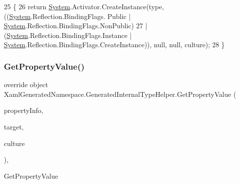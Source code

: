 \begin{DoxyCode}
25                                                                                                            
        \{
26             \textcolor{keywordflow}{return} \hyperlink{namespaceSystem}{System}.Activator.CreateInstance(type, ((\hyperlink{namespaceSystem}{System}.Reflection.BindingFlags.
      Public | \hyperlink{namespaceSystem}{System}.Reflection.BindingFlags.NonPublic) 
27                             | (\hyperlink{namespaceSystem}{System}.Reflection.BindingFlags.Instance | 
      \hyperlink{namespaceSystem}{System}.Reflection.BindingFlags.CreateInstance)), null, null, culture);
28         \}
\end{DoxyCode}
\mbox{\label{classXamlGeneratedNamespace_1_1GeneratedInternalTypeHelper_afdc9fe15b56607d02082908d934480c6}} 
\subsubsection{\texorpdfstring{Get\+Property\+Value()}{GetPropertyValue()}\hspace{0.1cm}{\footnotesize\ttfamily [1/3]}}
{\footnotesize\ttfamily override object Xaml\+Generated\+Namespace.\+Generated\+Internal\+Type\+Helper.\+Get\+Property\+Value (\begin{DoxyParamCaption}\item[{System.\+Reflection.\+Property\+Info}]{property\+Info,  }\item[{object}]{target,  }\item[{System.\+Globalization.\+Culture\+Info}]{culture }\end{DoxyParamCaption})\hspace{0.3cm}{\ttfamily [inline]}, {\ttfamily [protected]}}



Get\+Property\+Value 



